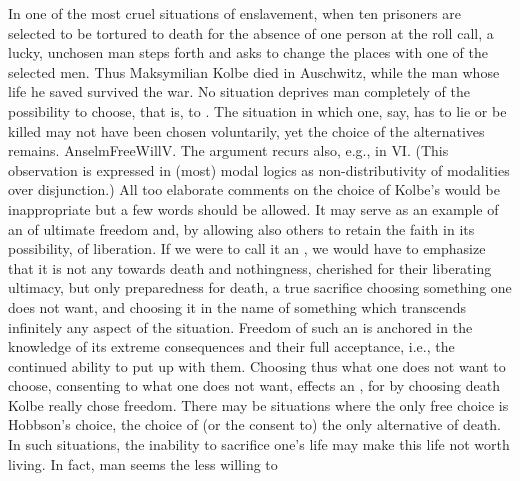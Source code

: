 In one of the most cruel situations of enslavement, when ten prisoners are
selected to be tortured to death for the absence of one person at the roll call,
a lucky, unchosen man steps forth and asks to change the places with one of the
selected men. Thus Maksymilian Kolbe died in Auschwitz, while the man whose life
he saved survived the war.  No situation deprives man completely of the
possibility to choose, that is, to . The situation in which one, say,
has to lie or be killed may not have been chosen voluntarily, yet the choice of
the alternatives remains. \citet{Therefore although he either lies or is killed
  unwillingly, it does not follow that he lies unwillingly or is killed
  unwillingly.}{AnselmFreeWill}{V. The argument recurs also, e.g., in
  \citeauthor*{AnselmConcord}{VI}. (This observation is expressed in (most)
  modal logics as non-distributivity of modalities over disjunction.)}  All too
elaborate comments on the choice of Kolbe's would be inappropriate but a few
words should be allowed. It may
serve as an example of an  of ultimate freedom and, by allowing also
others to retain the faith in its possibility, of liberation.  If we were to
call it an , we would have to emphasize that it
is not any  towards death and nothingness, cherished for their
liberating ultimacy, but only preparedness for death, a true sacrifice choosing
something one does not want, and choosing it in the name of something which
transcends infinitely any  aspect of the
situation. Freedom of such an  is anchored in the
knowledge of its extreme consequences and their full acceptance, i.e., the
continued ability to put up with them.  Choosing thus what one does not want to
choose, consenting to what one does not want, effects an , for by
choosing death Kolbe really chose freedom.  There may be situations where the
only free choice is Hobbson's choice, the choice of (or the consent to) the only
alternative of death. In such situations, the inability to sacrifice one's life
may make this life not worth living. In fact, man seems the less willing to
